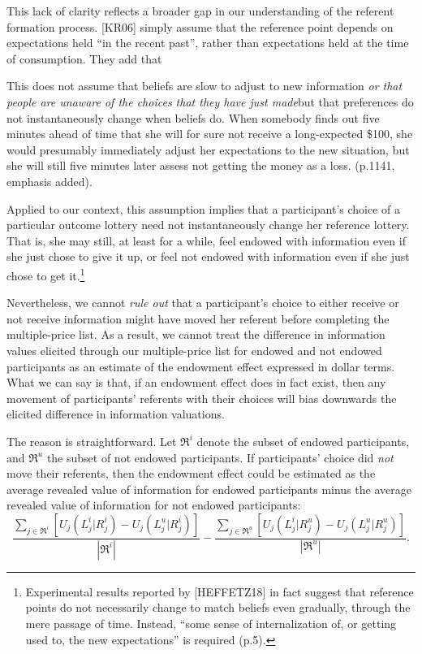 \documentclass[12pt]{article}
\begin{document}
This lack of clarity reflects a broader gap in our understanding of the referent formation process. [KR06] simply assume that the reference point depends on expectations held \enquote{in the recent past}, rather than expectations held at the time of consumption. They add that
\begin{displayquote}
  This does not assume that beliefs are slow to adjust to new information \emph{or that people are unaware of the choices that they have just made}\textemdash but that preferences do not instantaneously change when beliefs do. When somebody finds out five minutes ahead of time that she will for sure not receive a long-expected \$100, she would presumably immediately adjust her expectations to the new situation, but she will still five minutes later assess not getting the money as a loss. (p.1141, emphasis added).
\end{displayquote}

Applied to our context, this assumption implies that a participant’s choice of a particular outcome lottery need not instantaneously change her reference lottery. That is, she may still, at least for a while, feel endowed with information even if she just chose to give it up, or feel not endowed with information even if she just chose to get it.\footnote{Experimental results reported by [HEFFETZ18] in fact suggest that reference points do not necessarily change to match beliefs even gradually, through the mere passage of time.  Instead, \enquote{some sense of internalization of, or getting used to, the new expectations} is required (p.5).}

Nevertheless, we cannot \emph{rule out} that a participant's choice to either receive or not receive information might have moved her referent before completing the multiple-price list. As a result, we cannot treat the difference in information values elicited through our multiple-price list for endowed and not endowed participants as an estimate of the endowment effect expressed in dollar terms. What we can say is that, if an endowment effect does in fact exist, then any movement of participants' referents with their choices will bias downwards the elicited difference in information valuations.

The reason is straightforward. Let $\Re^i$ denote the subset of endowed participants, and $\Re^u$ the subset of not endowed participants. If participants' choice did \emph{not} move their referents, then the endowment effect could be estimated as the average revealed value of information for endowed participants minus the average revealed value of information for not endowed participants:
\begin{equation*}
  \frac{\sum_{j \in \Re^i}[U_j(L_j^i|R_j^i)-U_j(L_j^u|R_j^i)]}
       {|\Re^i|}
  -
  \frac{\sum_{j \in \Re^u}[U_j(L_j^i|R_j^u)-U_j(L_j^u|R_j^u)]}
      {|\Re^u|}.
\end{equation*}
\end{document}
